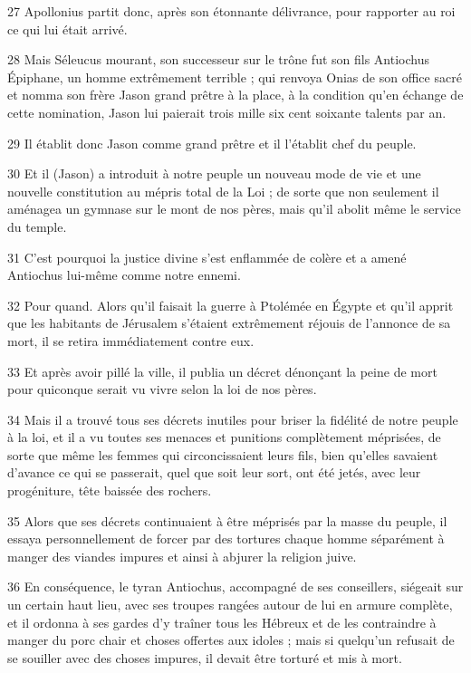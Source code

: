 \par 27 Apollonius partit donc, après son étonnante délivrance, pour rapporter au roi ce qui lui était arrivé.

\par 28 Mais Séleucus mourant, son successeur sur le trône fut son fils Antiochus Épiphane, un homme extrêmement terrible ; qui renvoya Onias de son office sacré et nomma son frère Jason grand prêtre à la place, à la condition qu'en échange de cette nomination, Jason lui paierait trois mille six cent soixante talents par an.

\par 29 Il établit donc Jason comme grand prêtre et il l'établit chef du peuple.

\par 30 Et il (Jason) a introduit à notre peuple un nouveau mode de vie et une nouvelle constitution au mépris total de la Loi ; de sorte que non seulement il aménagea un gymnase sur le mont de nos pères, mais qu'il abolit même le service du temple.

\par 31 C'est pourquoi la justice divine s'est enflammée de colère et a amené Antiochus lui-même comme notre ennemi.

\par 32 Pour quand. Alors qu'il faisait la guerre à Ptolémée en Égypte et qu'il apprit que les habitants de Jérusalem s'étaient extrêmement réjouis de l'annonce de sa mort, il se retira immédiatement contre eux.

\par 33 Et après avoir pillé la ville, il publia un décret dénonçant la peine de mort pour quiconque serait vu vivre selon la loi de nos pères.

\par 34 Mais il a trouvé tous ses décrets inutiles pour briser la fidélité de notre peuple à la loi, et il a vu toutes ses menaces et punitions complètement méprisées, de sorte que même les femmes qui circoncissaient leurs fils, bien qu'elles savaient d'avance ce qui se passerait, quel que soit leur sort, ont été jetés, avec leur progéniture, tête baissée des rochers.

\par 35 Alors que ses décrets continuaient à être méprisés par la masse du peuple, il essaya personnellement de forcer par des tortures chaque homme séparément à manger des viandes impures et ainsi à abjurer la religion juive.

\par 36 En conséquence, le tyran Antiochus, accompagné de ses conseillers, siégeait sur un certain haut lieu, avec ses troupes rangées autour de lui en armure complète, et il ordonna à ses gardes d'y traîner tous les Hébreux et de les contraindre à manger du porc chair et choses offertes aux idoles ; mais si quelqu'un refusait de se souiller avec des choses impures, il devait être torturé et mis à mort.


